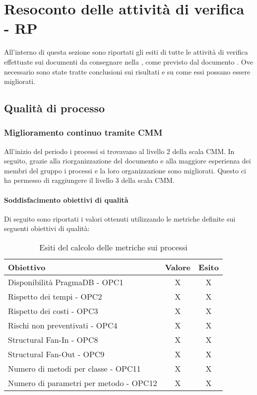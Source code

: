 \documentclass[PdQ.tex]{subfiles}
\begin{document}
\section{Resoconto delle attività di verifica - RP}
All'interno di questa sezione sono riportati gli esiti di tutte le attività di verifica effettuate sui documenti da consegnare nella \RP{}, come previsto dal documento \PPdocRP{}. Ove necessario sono state tratte conclusioni sui risultati e su come essi possano essere migliorati.

\subsection{Qualità di processo}
		\subsubsection{Miglioramento continuo tramite CMM}
	
		All'inizio del periodo i processi si trovavano al livello 2 della scala CMM. In seguito, grazie alla riorganizzazione del documento \NPdocRP{} e alla maggiore esperienza dei membri del gruppo i processi e la loro organizzazione sono migliorati. Questo ci ha permesso di raggiungere il livello 3 della scala CMM. 

		\paragraph{Soddisfacimento obiettivi di qualità}
			Di seguito sono riportati i valori ottenuti utilizzando le metriche definite sui seguenti obiettivi di qualità:
			\begin{table}[h]
				\centering
				\begin{tabular}{l c c}
					\hline
					\rule[-0.3cm]{0cm}{0.8cm}
					\textbf{Obiettivo} & \textbf{Valore} & \textbf{Esito} \\
					\hline
					\rule[0cm]{0cm}{0.4cm}
					Disponibilità PragmaDB - OPC1 & X & X \\
					\rule[0cm]{0cm}{0.4cm}
					Rispetto dei tempi - OPC2 & X & X \\
					\rule[0cm]{0cm}{0.4cm}
					Rispetto dei costi - OPC3 & X & X\\ 
					\rule[0cm]{0cm}{0.4cm}
					Rischi non preventivati - OPC4 & X & X\\ 
					\rule[0cm]{0cm}{0.4cm}
					Structural Fan-In - OPC8 & X & X\\ 
					\rule[0cm]{0cm}{0.4cm}
					Structural Fan-Out - OPC9 & X & X\\ 
					\rule[0cm]{0cm}{0.4cm}
					Numero di metodi per classe - OPC11 & X & X\\ 
					\rule[0cm]{0cm}{0.4cm}
					Numero di parametri per metodo - OPC12 & X & X\\ 
					\hline
				\end{tabular}
				\caption{Esiti del calcolo delle metriche sui processi}
			\end{table}
		
\end{document}
